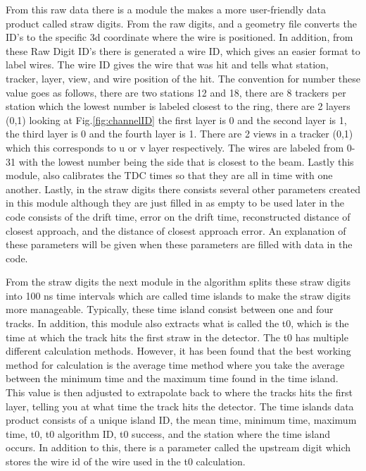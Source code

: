 \documentclass[./Thesis]{subfiles}
\begin{document}
	
	From this raw data there is a module the makes a more user-friendly data product called straw digits.  From the raw digits, and a geometry file converts the ID's to the specific 3d coordinate where the wire is positioned.  In addition, from these Raw Digit ID's there is generated a wire ID, which gives an easier format to label wires.  The wire ID gives the wire that was hit and tells what station, tracker, layer, view, and wire position of the hit.  The convention for number these value goes as follows, there are two stations 12 and 18, there are 8 trackers per station which the lowest number is labeled closest to the ring, there are 2 layers (0,1) looking at Fig.\ref{fig:channelID} the first layer is 0 and the second layer is 1, the third layer is 0 and the fourth layer is 1. There are 2 views in a tracker (0,1) which this corresponds to u or v layer respectively. The wires are labeled from 0-31 with the lowest number being the side that is closest to the beam.  Lastly this module, also calibrates the TDC times so that they are all in time with one another.  Lastly, in the straw digits there consists several other parameters created in this module although they are just filled in as empty to be used later in the code consists of the drift time,  error on the drift time, reconstructed distance of closest approach, and the distance of closest approach error. An explanation of these parameters will be given when these parameters are filled with data in the code. 
	
	From the straw digits the next module in the algorithm splits these straw digits into 100 ns time intervals which are called time islands to make the straw digits more manageable.  Typically, these time island consist between one and four tracks.  In addition, this module also extracts what is called the t0, which is the time at which the track hits the first straw in the detector.  The t0 has multiple different calculation methods.  However, it has been found that the best working method for calculation is the average time method where you take the average between the minimum time and the maximum time found in the time island.  This value is then adjusted to extrapolate back to where the tracks hits the first layer, telling you at what time the track hits the detector.  The time islands data product consists of a unique island ID, the mean time, minimum time, maximum time, t0, t0 algorithm ID, t0 success, and the station where the time island occurs.  In addition to this, there is a parameter called the upstream digit which stores the wire id of the wire used in the t0 calculation.
	
\end{document}
